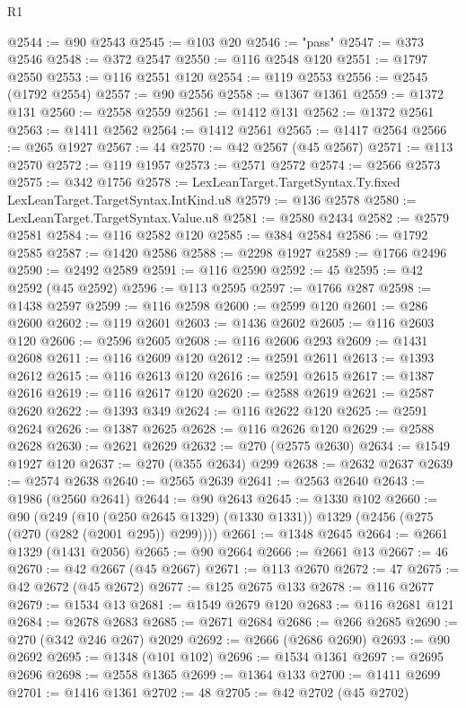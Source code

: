 \begin{lexlean}{R1}
\begin{coremodule}
@2544 := @90 @2543
@2545 := @103 @20
@2546 := "pass"
@2547 := @373 @2546
@2548 := @372 @2547
@2550 := @116 @2548 @120
@2551 := @1797 @2550
@2553 := @116 @2551 @120
@2554 := @119 @2553
@2556 := @2545 (@1792 @2554)
@2557 := @90 @2556
@2558 := @1367 @1361
@2559 := @1372 @131
@2560 := @2558 @2559
@2561 := @1412 @131
@2562 := @1372 @2561
@2563 := @1411 @2562
@2564 := @1412 @2561
@2565 := @1417 @2564
@2566 := @265 @1927
@2567 := 44
@2570 := @42 @2567 (@45 @2567)
@2571 := @113 @2570
@2572 := @119 @1957
@2573 := @2571 @2572
@2574 := @2566 @2573
@2575 := @342 @1756
@2578 := LexLeanTarget.TargetSyntax.Ty.fixed LexLeanTarget.TargetSyntax.IntKind.u8
@2579 := @136 @2578
@2580 := LexLeanTarget.TargetSyntax.Value.u8
@2581 := @2580 @2434
@2582 := @2579 @2581
@2584 := @116 @2582 @120
@2585 := @384 @2584
@2586 := @1792 @2585
@2587 := @1420 @2586
@2588 := @2298 @1927
@2589 := @1766 @2496
@2590 := @2492 @2589
@2591 := @116 @2590
@2592 := 45
@2595 := @42 @2592 (@45 @2592)
@2596 := @113 @2595
@2597 := @1766 @287
@2598 := @1438 @2597
@2599 := @116 @2598
@2600 := @2599 @120
@2601 := @286 @2600
@2602 := @119 @2601
@2603 := @1436 @2602
@2605 := @116 @2603 @120
@2606 := @2596 @2605
@2608 := @116 @2606 @293
@2609 := @1431 @2608
@2611 := @116 @2609 @120
@2612 := @2591 @2611
@2613 := @1393 @2612
@2615 := @116 @2613 @120
@2616 := @2591 @2615
@2617 := @1387 @2616
@2619 := @116 @2617 @120
@2620 := @2588 @2619
@2621 := @2587 @2620
@2622 := @1393 @349
@2624 := @116 @2622 @120
@2625 := @2591 @2624
@2626 := @1387 @2625
@2628 := @116 @2626 @120
@2629 := @2588 @2628
@2630 := @2621 @2629
@2632 := @270 (@2575 @2630)
@2634 := @1549 @1927 @120
@2637 := @270 (@355 @2634) @299
@2638 := @2632 @2637
@2639 := @2574 @2638
@2640 := @2565 @2639
@2641 := @2563 @2640
@2643 := @1986 (@2560 @2641)
@2644 := @90 @2643
@2645 := @1330 @102
@2660 := @90
    (@249
      (@10 (@250 @2645 @1329) (@1330 @1331))
      @1329
      (@2456 (@275 (@270 (@282 (@2001 @295)) @299))))
@2661 := @1348 @2645
@2664 := @2661 @1329 (@1431 @2056)
@2665 := @90 @2664
@2666 := @2661 @13
@2667 := 46
@2670 := @42 @2667 (@45 @2667)
@2671 := @113 @2670
@2672 := 47
@2675 := @42 @2672 (@45 @2672)
@2677 := @125 @2675 @133
@2678 := @116 @2677
@2679 := @1534 @13
@2681 := @1549 @2679 @120
@2683 := @116 @2681 @121
@2684 := @2678 @2683
@2685 := @2671 @2684
@2686 := @266 @2685
@2690 := @270 (@342 @246 @267) @2029
@2692 := @2666 (@2686 @2690)
@2693 := @90 @2692
@2695 := @1348 (@101 @102)
@2696 := @1534 @1361
@2697 := @2695 @2696
@2698 := @2558 @1365
@2699 := @1364 @133
@2700 := @1411 @2699
@2701 := @1416 @1361
@2702 := 48
@2705 := @42 @2702 (@45 @2702)

\end{coremodule}
\end{lexlean}
